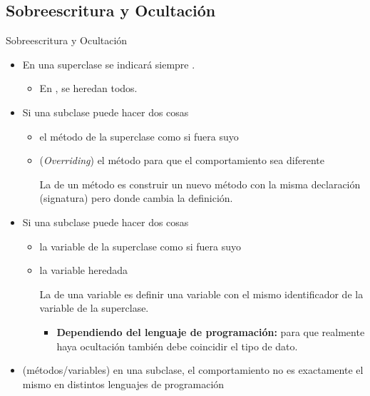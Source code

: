 \documentclass[10pt,envcountsect,spanish]{beamer}
\begin{document}







\subsection{Sobreescritura y Ocultación}


\begin{frame}{Sobreescritura y Ocultación} 

\begin{itemize}
\item En una superclase  se indicará siempre .
\begin{itemize}
\item En , se heredan todos.
\end{itemize}

\item Si una subclase  puede hacer dos cosas
\begin{itemize}
\item {} el método de la superclase como si fuera suyo
\item {} (\textit{Overriding}) el método para que el comportamiento sea diferente

La  de un método es construir un nuevo método con la misma declaración (signatura) pero donde cambia la definición.
\end{itemize}

\item Si una subclase  puede hacer dos cosas
\begin{itemize}
\item {} la variable de la superclase como si fuera suyo
\item {} la variable heredada

La  de una variable es definir una variable con el mismo identificador de la variable de la superclase.

\begin{itemize}
\item \textbf{Dependiendo del lenguaje de programación:} para que realmente haya ocultación también debe coincidir el tipo de dato.
\end{itemize} 
\end{itemize}

\item {} (métodos/variables) en una subclase, el comportamiento no es exactamente el mismo en distintos lenguajes de programación
\end{itemize}
\end{frame}
\end{document}

